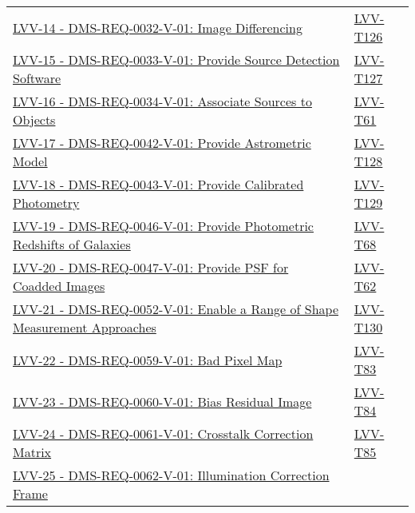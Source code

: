 \begin{longtable}[]{p{13cm}p{3cm}}
\href{https://jira.lsstcorp.org/browse/LVV-14}{LVV-14 -
DMS-REQ-0032-V-01: Image Differencing} &
\protect\hyperlink{lvv-t126---verify-implementation--image-differencing-dms-req-0032}{LVV-T126}\tabularnewline
\href{https://jira.lsstcorp.org/browse/LVV-15}{LVV-15 -
DMS-REQ-0033-V-01: Provide Source Detection Software} &
\protect\hyperlink{lvv-t127---verify-implementation-of-provide-source-detection-software-dms-req-0033}{LVV-T127}\tabularnewline
\href{https://jira.lsstcorp.org/browse/LVV-16}{LVV-16 -
DMS-REQ-0034-V-01: Associate Sources to Objects} &
\protect\hyperlink{lvv-t61---verify-implementation-of-associate-sources-to-objects--dms-req-0034}{LVV-T61}\tabularnewline
\href{https://jira.lsstcorp.org/browse/LVV-17}{LVV-17 -
DMS-REQ-0042-V-01: Provide Astrometric Model} &
\protect\hyperlink{lvv-t128---verify-implementation-provide-astrometric-model-dms-req-0042}{LVV-T128}\tabularnewline
\href{https://jira.lsstcorp.org/browse/LVV-18}{LVV-18 -
DMS-REQ-0043-V-01: Provide Calibrated Photometry} &
\protect\hyperlink{lvv-t129---verify-implementation-of-provide-calibrated-photometry-dms-req-0043}{LVV-T129}\tabularnewline
\href{https://jira.lsstcorp.org/browse/LVV-19}{LVV-19 -
DMS-REQ-0046-V-01: Provide Photometric Redshifts of Galaxies} &
\protect\hyperlink{lvv-t68---verify-implementation-of-provide-photometric-redshifts-of-galaxies-dms-req-0046}{LVV-T68}\tabularnewline
\href{https://jira.lsstcorp.org/browse/LVV-20}{LVV-20 -
DMS-REQ-0047-V-01: Provide PSF for Coadded Images} &
\protect\hyperlink{lvv-t62---verify-implementation-of-provide-psf-for-coadded-images-dms-req-0047}{LVV-T62}\tabularnewline
\href{https://jira.lsstcorp.org/browse/LVV-21}{LVV-21 -
DMS-REQ-0052-V-01: Enable a Range of Shape Measurement Approaches} &
\protect\hyperlink{lvv-t130---verify-implementation-of-enable-a-range-of-shape-measurement-approaches-dms-req-0052}{LVV-T130}\tabularnewline
\href{https://jira.lsstcorp.org/browse/LVV-22}{LVV-22 -
DMS-REQ-0059-V-01: Bad Pixel Map} &
\protect\hyperlink{lvv-t83---verify-implementation-of-bad-pixel-map-dms-req-0059}{LVV-T83}\tabularnewline
\href{https://jira.lsstcorp.org/browse/LVV-23}{LVV-23 -
DMS-REQ-0060-V-01: Bias Residual Image} &
\protect\hyperlink{lvv-t84---verify-implementation-of-bias-residual-image-dms-req-0060}{LVV-T84}\tabularnewline
\href{https://jira.lsstcorp.org/browse/LVV-24}{LVV-24 -
DMS-REQ-0061-V-01: Crosstalk Correction Matrix} &
\protect\hyperlink{lvv-t85---verify-implementation-of-crosstalk-correction-matrix-dms-req-0061}{LVV-T85}\tabularnewline
\href{https://jira.lsstcorp.org/browse/LVV-25}{LVV-25 -
DMS-REQ-0062-V-01: Illumination Correction Frame} &

\end{longtable}
